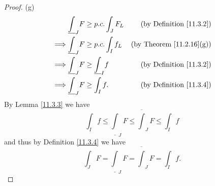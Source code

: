 \begin{proof}{(g)}
    \begin{align*}
                 & \underline{\int}_J F \geq p.c. \int_J F_L      & \text{(by Definition \ref{11.3.2})}  \\
        \implies & \underline{\int}_J F \geq p.c. \int_I f_L      & \text{(by Theorem \ref{11.2.16}(g))} \\
        \implies & \underline{\int}_J F \geq \underline{\int}_I f & \text{(by Definition \ref{11.3.2})}  \\
        \implies & \underline{\int}_J F \geq \int_I f.            & \text{(by Definition \ref{11.3.4})}
    \end{align*}
    By Lemma \ref{11.3.3} we have
    \[
        \int_I f \leq \underline{\int}_J F \leq \overline{\int}_J F \leq \int_I f
    \]
    and thus by Definition \ref{11.3.4} we have
    \[
        \int_J F = \underline{\int}_J F = \overline{\int}_J F = \int_I f.
    \]
\end{proof}

